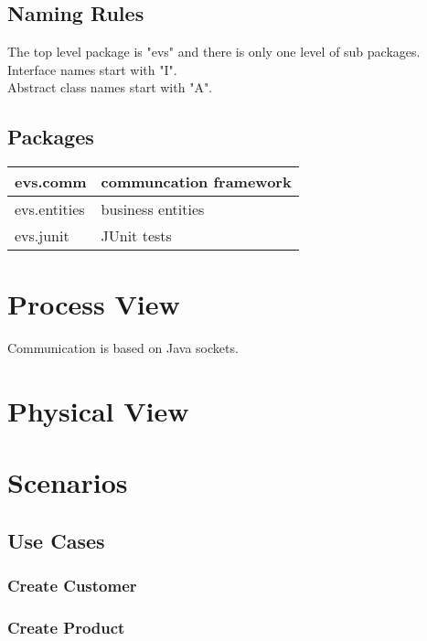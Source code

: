 \documentclass[a4paper]{article}
\begin{document}
\subsection{Naming Rules}

The top level package is "evs" and there is only one level of sub packages.\\
Interface names start with "I".\\
Abstract class names start with "A".\\

\subsection{Packages}

	\begin{tabular}{|l|l|}
	\hline
	evs.comm & communcation framework\\
	\hline
	evs.entities & business entities\\
	\hline
	evs.junit & JUnit tests\\
	\hline
	\end{tabular}

\section{Process View}

Communication is based on Java sockets.

\section{Physical View}

\section{Scenarios}

\subsection{Use Cases}

\subsubsection{Create Customer}

\subsubsection{Create Product}
\end{document}
